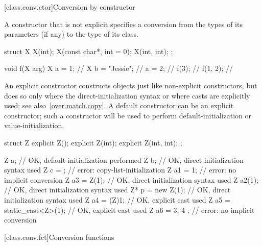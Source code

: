 [class.conv.ctor]{Conversion by constructor}%
%

\pnum
A constructor that is not explicit
specifies a conversion from
the types of its parameters (if any)
to the type of its class.
\begin{example}
%
\begin{codeblock}
struct X {
    X(int);
    X(const char*, int = 0);
    X(int, int);
};

void f(X arg) {
  X a = 1;          // 
  X b = "Jessie";   // 
  a = 2;            // 
  f(3);             // 
  f({1, 2});        // 
}
\end{codeblock}
\end{example}

\pnum
\begin{note}
An explicit constructor constructs objects just like non-explicit
constructors, but does so only where the direct-initialization syntax
or where casts are explicitly
used; see also~\ref{over.match.copy}.
A default constructor can be an explicit constructor; such a constructor
will be used to perform default-initialization
or value-initialization.
\begin{example}
\begin{codeblock}
struct Z {
  explicit Z();
  explicit Z(int);
  explicit Z(int, int);
};

Z a;                            // OK, default-initialization performed
Z b{};                          // OK, direct initialization syntax used
Z c = {};                       // error: copy-list-initialization
Z a1 = 1;                       // error: no implicit conversion
Z a3 = Z(1);                    // OK, direct initialization syntax used
Z a2(1);                        // OK, direct initialization syntax used
Z* p = new Z(1);                // OK, direct initialization syntax used
Z a4 = (Z)1;                    // OK, explicit cast used
Z a5 = static_cast<Z>(1);       // OK, explicit cast used
Z a6 = { 3, 4 };                // error: no implicit conversion
\end{codeblock}
\end{example}
\end{note}

[class.conv.fct]{Conversion functions}%
%
%
%

